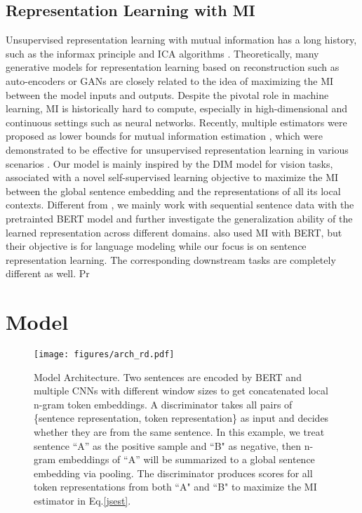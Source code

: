 \documentclass[11pt,a4paper]{article}
\begin{document}
\subsection{Representation Learning with MI}
Unsupervised representation learning with mutual information has a long history, such as the informax principle and ICA algorithms \cite{bell1995information,hyvarinen2000independent}. Theoretically, many generative models for representation learning based on reconstruction such as auto-encoders or GANs \cite{nowozin2016} are closely related to the idea of maximizing the MI between the model inputs and outputs. Despite the pivotal role in machine learning, MI is historically hard to compute, especially in high-dimensional and continuous settings such as neural networks. Recently, multiple estimators were proposed as lower bounds for mutual information estimation \cite{belghazi2018mine,oord2018}, which were demonstrated to be effective for unsupervised representation learning in various scenarios \cite{hjelm2019,ji2019,sun2019infograph,kong2020}. Our model is mainly inspired by the DIM model \cite{hjelm2019} for vision tasks, associated with a novel self-supervised learning objective to maximize the MI between the global sentence embedding and the representations of all its local contexts. Different from \cite{hjelm2019}, we mainly work with sequential sentence data with the pretrainted BERT model and further investigate the generalization ability of the learned representation across different domains. \citet{kong2020} also used MI with BERT, but their objective is for language modeling while our focus is on sentence representation learning. The corresponding downstream tasks are completely different as well. Pr \section{Model}

\begin{figure*}
    \centering
    \texttt{[image: figures/arch\_rd.pdf]}
    \vspace{-1mm}
    \caption{Model Architecture. Two sentences are encoded by BERT and multiple CNNs with different window sizes to get concatenated local n-gram token embeddings. A discriminator  takes all pairs of \{sentence representation, token representation\} as input and decides whether they are from the same sentence. In this example, we treat sentence ``A'' as the positive sample and ``B" as negative, then n-gram embeddings of ``A'' will be summarized to a global sentence embedding via pooling. The discriminator produces scores for all token representations from both ``A" and ``B" to maximize the MI estimator in Eq.\ref{jsest}. 
}
\vspace{-5mm}
    \label{fig:layercomp}
\end{figure*}
\end{document}
